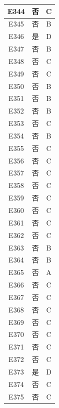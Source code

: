 \documentclass[UTF8]{ctexart}
\begin{document}
\begin{center}
\begin{longtable}{|c|c|c|}
		E344     & 否       & C        \\ \hline
		E345     & 否       & B        \\ \hline
		E346     & 是       & D        \\ \hline
		E347     & 否       & B        \\ \hline
		E348     & 否       & C        \\ \hline
		E349     & 否       & C        \\ \hline
		E350     & 否       & B        \\ \hline
		E351     & 否       & B        \\ \hline
		E352     & 否       & B        \\ \hline
		E353     & 否       & C        \\ \hline
		E354     & 否       & B        \\ \hline
		E355     & 否       & C        \\ \hline
		E356     & 否       & C        \\ \hline
		E357     & 否       & C        \\ \hline
		E358     & 否       & C        \\ \hline
		E359     & 否       & C        \\ \hline
		E360     & 否       & C        \\ \hline
		E361     & 否       & C        \\ \hline
		E362     & 否       & C        \\ \hline
		E363     & 否       & B        \\ \hline
		E364     & 否       & B        \\ \hline
		E365     & 否       & A        \\ \hline
		E366     & 否       & C        \\ \hline
		E367     & 否       & C        \\ \hline
		E368     & 否       & C        \\ \hline
		E369     & 否       & C        \\ \hline
		E370     & 否       & C        \\ \hline
		E371     & 否       & C        \\ \hline
		E372     & 否       & C        \\ \hline
		E373     & 是       & D        \\ \hline
		E374     & 否       & C        \\ \hline
		E375     & 否       & C        \\ \hline

\end{longtable}
\end{center}
\end{document}
